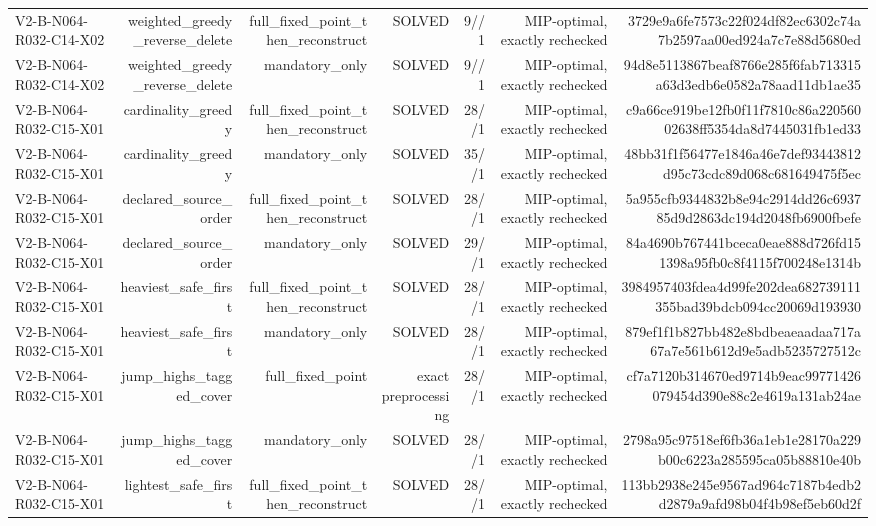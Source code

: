{\begin{longtable}{lrrrrrr}
V2-B-N064-R032-C14-X02 & weighted\_greedy\_reverse\_delete & full\_fixed\_point\_then\_reconstruct & SOLVED & 9//1 & MIP-optimal, exactly rechecked & 3729e9a6fe7573c22f024df82ec6302c74a7b2597aa00ed924a7c7e88d5680ed \\
V2-B-N064-R032-C14-X02 & weighted\_greedy\_reverse\_delete & mandatory\_only & SOLVED & 9//1 & MIP-optimal, exactly rechecked & 94d8e5113867beaf8766e285f6fab713315a63d3edb6e0582a78aad11db1ae35 \\
V2-B-N064-R032-C15-X01 & cardinality\_greedy & full\_fixed\_point\_then\_reconstruct & SOLVED & 28//1 & MIP-optimal, exactly rechecked & c9a66ce919be12fb0f11f7810c86a22056002638ff5354da8d7445031fb1ed33 \\
V2-B-N064-R032-C15-X01 & cardinality\_greedy & mandatory\_only & SOLVED & 35//1 & MIP-optimal, exactly rechecked & 48bb31f1f56477e1846a46e7def93443812d95c73cdc89d068c681649475f5ec \\
V2-B-N064-R032-C15-X01 & declared\_source\_order & full\_fixed\_point\_then\_reconstruct & SOLVED & 28//1 & MIP-optimal, exactly rechecked & 5a955cfb9344832b8e94c2914dd26c693785d9d2863dc194d2048fb6900fbefe \\
V2-B-N064-R032-C15-X01 & declared\_source\_order & mandatory\_only & SOLVED & 29//1 & MIP-optimal, exactly rechecked & 84a4690b767441bceca0eae888d726fd151398a95fb0c8f4115f700248e1314b \\
V2-B-N064-R032-C15-X01 & heaviest\_safe\_first & full\_fixed\_point\_then\_reconstruct & SOLVED & 28//1 & MIP-optimal, exactly rechecked & 3984957403fdea4d99fe202dea682739111355bad39bdcb094cc20069d193930 \\
V2-B-N064-R032-C15-X01 & heaviest\_safe\_first & mandatory\_only & SOLVED & 28//1 & MIP-optimal, exactly rechecked & 879ef1f1b827bb482e8bdbeaeaadaa717a67a7e561b612d9e5adb5235727512c \\
V2-B-N064-R032-C15-X01 & jump\_highs\_tagged\_cover & full\_fixed\_point & exact preprocessing & 28//1 & MIP-optimal, exactly rechecked & cf7a7120b314670ed9714b9eac99771426079454d390e88c2e4619a131ab24ae \\
V2-B-N064-R032-C15-X01 & jump\_highs\_tagged\_cover & mandatory\_only & SOLVED & 28//1 & MIP-optimal, exactly rechecked & 2798a95c97518ef6fb36a1eb1e28170a229b00c6223a285595ca05b88810e40b \\
V2-B-N064-R032-C15-X01 & lightest\_safe\_first & full\_fixed\_point\_then\_reconstruct & SOLVED & 28//1 & MIP-optimal, exactly rechecked & 113bb2938e245e9567ad964c7187b4edb2d2879a9afd98b04f4b98ef5eb60d2f \\

\end{longtable}}
